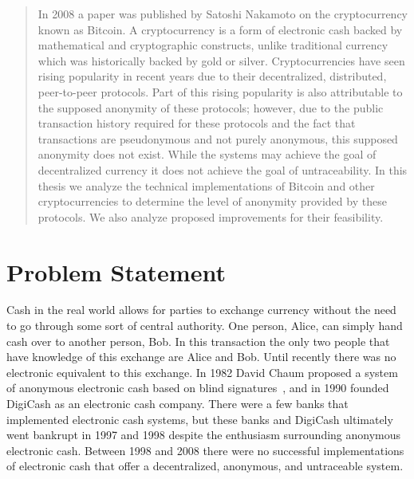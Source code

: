 \documentclass[11pt]{article}
\begin{document}
\begin{abstract}
In 2008 a paper was published by Satoshi Nakamoto on the cryptocurrency known as Bitcoin.  A cryptocurrency is a form of
electronic cash backed by mathematical and cryptographic constructs, unlike traditional currency which was historically
backed by gold or silver. Cryptocurrencies have seen rising popularity in recent years due to their decentralized,
distributed, peer-to-peer protocols. Part of this rising popularity is also attributable to the supposed anonymity of
these protocols; however, due to the public transaction history required for these protocols and the fact that
transactions are pseudonymous and not purely anonymous, this supposed anonymity does not exist. While the systems may
achieve the goal of decentralized currency it does not achieve the goal of untraceability. In this thesis we analyze the
technical implementations of Bitcoin and other cryptocurrencies to determine the level of anonymity provided by these
protocols. We also analyze proposed improvements for their feasibility.  \end{abstract} \clearpage
{} \tableofcontents \listoffigures \pagebreak \section{Problem Statement} Cash in the real world
allows for parties to exchange currency without the need to go through some sort of central authority. One person,
Alice, can simply hand cash over to another person, Bob. In this transaction the only two people that have knowledge of
this exchange are Alice and Bob. Until recently there was no electronic equivalent to this exchange. In 1982 David Chaum
proposed a system of anonymous electronic cash based on blind signatures~\cite{chaum83}, and in 1990 founded DigiCash as
an electronic cash company. There were a few banks that implemented electronic cash systems, but these banks and
DigiCash ultimately went bankrupt in 1997 and 1998 despite the enthusiasm surrounding anonymous electronic cash.
Between 1998 and 2008 there were no successful implementations of electronic cash that offer a decentralized, anonymous,
and untraceable system.
\end{document}
